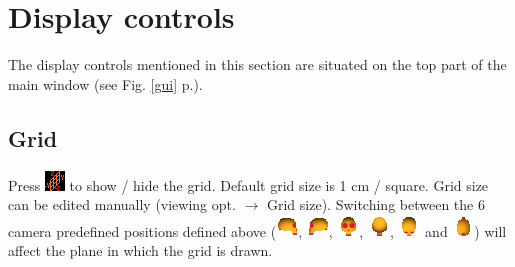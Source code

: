 \section{Display controls}
The display controls mentioned in this section are situated on the top part of the main window (see Fig. \ref{gui} p.\pageref{gui}).


\subsection{Grid}
Press \includegraphics[scale=0.7]{images/06/display/grid.png} to show / hide the grid. Default grid size is 1 cm / square. Grid size can be edited manually
(viewing opt. $\rightarrow$ Grid size).
Switching between the 6 camera predefined positions defined above (\includegraphics[scale=0.7]{images/06/camera/camera_right.png}, 
\includegraphics[scale=0.7]{images/06/camera/camera_left.png}, 
\includegraphics[scale=0.7]{images/06/camera/camera_front.png}, 
\includegraphics[scale=0.7]{images/06/camera/camera_back.png}, 
\includegraphics[scale=0.7]{images/06/camera/camera_above.png} and 
\includegraphics[scale=0.7]{images/06/camera/camera_below.png})
will affect the plane in which the grid is drawn.




